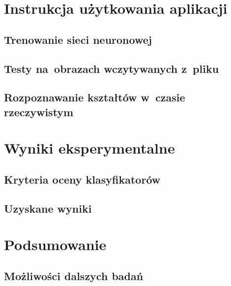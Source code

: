 \documentclass[11pt,a4paper]{article}
\begin{document}
\section{Instrukcja użytkowania aplikacji}

\subsection{Trenowanie sieci neuronowej}

\subsection{Testy na~obrazach wczytywanych z~pliku}

\subsection{Rozpoznawanie kształtów w~czasie rzeczywistym}

\section{Wyniki eksperymentalne}

\subsection{Kryteria oceny klasyfikatorów}

\subsection{Uzyskane wyniki}

\section{Podsumowanie}

\subsection{Możliwości dalszych badań}
\end{document}
